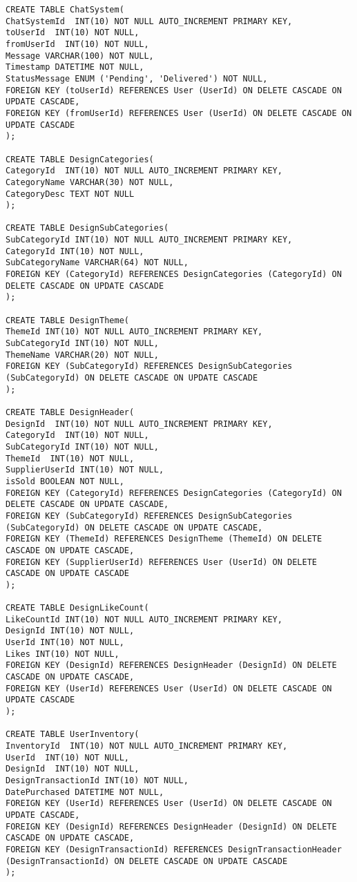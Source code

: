\begin{lstlisting}
CREATE TABLE ChatSystem(
ChatSystemId  INT(10) NOT NULL AUTO_INCREMENT PRIMARY KEY,
toUserId  INT(10) NOT NULL,
fromUserId  INT(10) NOT NULL,
Message VARCHAR(100) NOT NULL,
Timestamp DATETIME NOT NULL,
StatusMessage ENUM ('Pending', 'Delivered') NOT NULL,
FOREIGN KEY (toUserId) REFERENCES User (UserId) ON DELETE CASCADE ON UPDATE CASCADE,
FOREIGN KEY (fromUserId) REFERENCES User (UserId) ON DELETE CASCADE ON UPDATE CASCADE
);

CREATE TABLE DesignCategories(
CategoryId  INT(10) NOT NULL AUTO_INCREMENT PRIMARY KEY,
CategoryName VARCHAR(30) NOT NULL,
CategoryDesc TEXT NOT NULL
);

CREATE TABLE DesignSubCategories(
SubCategoryId INT(10) NOT NULL AUTO_INCREMENT PRIMARY KEY,
CategoryId INT(10) NOT NULL,
SubCategoryName VARCHAR(64) NOT NULL,
FOREIGN KEY (CategoryId) REFERENCES DesignCategories (CategoryId) ON DELETE CASCADE ON UPDATE CASCADE
);

CREATE TABLE DesignTheme(
ThemeId INT(10) NOT NULL AUTO_INCREMENT PRIMARY KEY,
SubCategoryId INT(10) NOT NULL,
ThemeName VARCHAR(20) NOT NULL,
FOREIGN KEY (SubCategoryId) REFERENCES DesignSubCategories (SubCategoryId) ON DELETE CASCADE ON UPDATE CASCADE
);

CREATE TABLE DesignHeader(
DesignId  INT(10) NOT NULL AUTO_INCREMENT PRIMARY KEY,
CategoryId  INT(10) NOT NULL,
SubCategoryId INT(10) NOT NULL,
ThemeId  INT(10) NOT NULL,
SupplierUserId INT(10) NOT NULL,
isSold BOOLEAN NOT NULL,
FOREIGN KEY (CategoryId) REFERENCES DesignCategories (CategoryId) ON DELETE CASCADE ON UPDATE CASCADE,
FOREIGN KEY (SubCategoryId) REFERENCES DesignSubCategories (SubCategoryId) ON DELETE CASCADE ON UPDATE CASCADE,
FOREIGN KEY (ThemeId) REFERENCES DesignTheme (ThemeId) ON DELETE CASCADE ON UPDATE CASCADE,
FOREIGN KEY (SupplierUserId) REFERENCES User (UserId) ON DELETE CASCADE ON UPDATE CASCADE
);

CREATE TABLE DesignLikeCount(
LikeCountId INT(10) NOT NULL AUTO_INCREMENT PRIMARY KEY,
DesignId INT(10) NOT NULL,
UserId INT(10) NOT NULL,
Likes INT(10) NOT NULL,
FOREIGN KEY (DesignId) REFERENCES DesignHeader (DesignId) ON DELETE CASCADE ON UPDATE CASCADE,
FOREIGN KEY (UserId) REFERENCES User (UserId) ON DELETE CASCADE ON UPDATE CASCADE
);

CREATE TABLE UserInventory(
InventoryId  INT(10) NOT NULL AUTO_INCREMENT PRIMARY KEY,
UserId  INT(10) NOT NULL,
DesignId  INT(10) NOT NULL,
DesignTransactionId INT(10) NOT NULL,
DatePurchased DATETIME NOT NULL,
FOREIGN KEY (UserId) REFERENCES User (UserId) ON DELETE CASCADE ON UPDATE CASCADE,
FOREIGN KEY (DesignId) REFERENCES DesignHeader (DesignId) ON DELETE CASCADE ON UPDATE CASCADE,
FOREIGN KEY (DesignTransactionId) REFERENCES DesignTransactionHeader (DesignTransactionId) ON DELETE CASCADE ON UPDATE CASCADE
);


\end{lstlisting}
